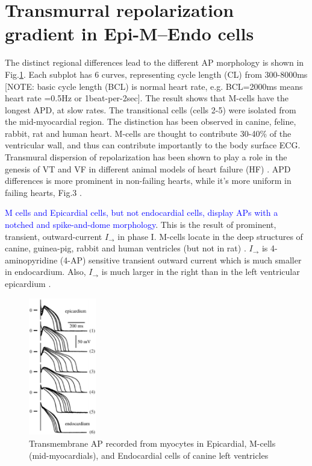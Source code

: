 \section{Transmurral repolarization gradient in Epi-M--Endo cells}

The distinct regional differences lead to the different AP morphology is shown
in Fig.\ref{fig:AP_morphology}. Each subplot has 6 curves, representing cycle
length (CL) from 300-8000ms [NOTE: basic cycle length (BCL) is normal heart
rate, e.g. BCL=2000ms means heart rate =0.5Hz or 1beat-per-2sec]. The result
shows that M-cells have the longest APD, at slow rates. The transitional cells
(cells 2-5) were isolated from the mid-myocardial region.
The distinction has been observed in canine, feline, rabbit, rat and human
heart. M-cells are thought to contribute 30-40\% of the ventricular wall, and
thus can contribute importantly to the body surface ECG. Transmural dispersion
of repolarization has been shown to play a role in the genesis of VT and VF in
different animal models of heart failure (HF) \citep{glukhov2010}. APD
differences is more prominent in non-failing hearts, while it's more uniform in
failing hearts, Fig.3 \citep{glukhov2010}.

 
\textcolor{blue}{M cells and Epicardial cells, but not endocardial cells,
display APs with a notched and spike-and-dome morphology}. This is the result of
prominent, transient, outward-current $I_\to$ in phase I. M-cells locate in the
deep structures of canine, guinea-pig, rabbit and human ventricles (but not in
rat) \citep{antzelevitch2001}. $I_\to$ is 4-aminopyridine (4-AP) sensitive
transient outward current which is much smaller in endocardium. Also, $I_\to$ is
much larger in the right than in the left ventricular epicardium
\citep{didiego1996}. 

\begin{figure}[hbt]
  \centerline{\includegraphics[height=6cm,
    angle=0]{./images/AP_ventricles.eps}}
  \caption{Transmembrane AP recorded from myocytes in Epicardial, M-cells
  (mid-myocardials), and Endocardial cells of canine left ventricles
  \citep{antzelevitch2001}}
\label{fig:AP_morphology}
\end{figure}

